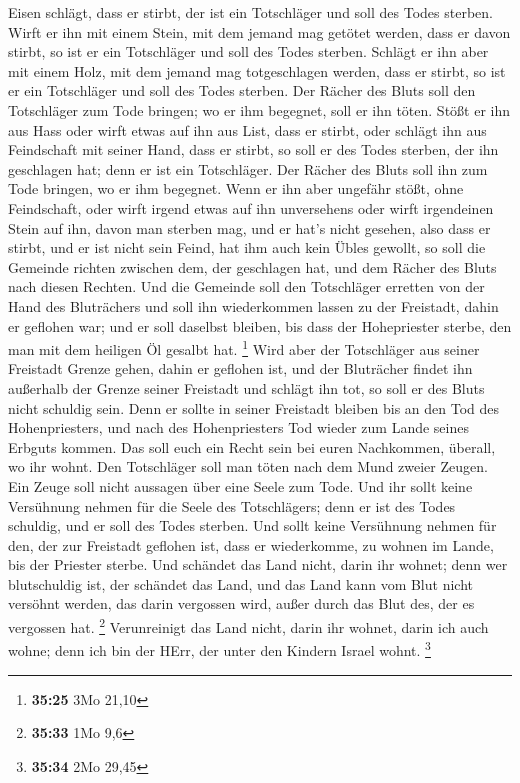 Eisen schlägt, dass er stirbt, der ist ein Totschläger und soll des
Todes sterben.  Wirft er ihn mit einem Stein, mit dem
jemand mag getötet werden, dass er davon stirbt, so ist er ein
Totschläger und soll des Todes sterben.  Schlägt er ihn
aber mit einem Holz, mit dem jemand mag totgeschlagen werden, dass er
stirbt, so ist er ein Totschläger und soll des Todes sterben.
 Der Rächer des Bluts soll den Totschläger zum Tode
bringen; wo er ihm begegnet, soll er ihn töten.  Stößt er
ihn aus Hass oder wirft etwas auf ihn aus List, dass er stirbt,
 oder schlägt ihn aus Feindschaft mit seiner Hand, dass er
stirbt, so soll er des Todes sterben, der ihn geschlagen hat; denn er
ist ein Totschläger. Der Rächer des Bluts soll ihn zum Tode bringen, wo
er ihm begegnet.  Wenn er ihn aber ungefähr stößt, ohne
Feindschaft, oder wirft irgend etwas auf ihn unversehens 
oder wirft irgendeinen Stein auf ihn, davon man sterben mag, und er
hat's nicht gesehen, also dass er stirbt, und er ist nicht sein Feind,
hat ihm auch kein Übles gewollt,  so soll die Gemeinde
richten zwischen dem, der geschlagen hat, und dem Rächer des Bluts nach
diesen Rechten.  Und die Gemeinde soll den Totschläger
erretten von der Hand des Bluträchers und soll ihn wiederkommen lassen
zu der Freistadt, dahin er geflohen war; und er soll daselbst bleiben,
bis dass der Hohepriester sterbe, den man mit dem heiligen Öl gesalbt
hat. \footnote{\textbf{35:25} 3Mo 21,10}  Wird aber der
Totschläger aus seiner Freistadt Grenze gehen, dahin er geflohen ist,
 und der Bluträcher findet ihn außerhalb der Grenze seiner
Freistadt und schlägt ihn tot, so soll er des Bluts nicht schuldig sein.
 Denn er sollte in seiner Freistadt bleiben bis an den Tod
des Hohenpriesters, und nach des Hohenpriesters Tod wieder zum Lande
seines Erbguts kommen.  Das soll euch ein Recht sein bei
euren Nachkommen, überall, wo ihr wohnt.  Den Totschläger
soll man töten nach dem Mund zweier Zeugen. Ein Zeuge soll nicht
aussagen über eine Seele zum Tode.  Und ihr sollt keine
Versühnung nehmen für die Seele des Totschlägers; denn er ist des Todes
schuldig, und er soll des Todes sterben.  Und sollt keine
Versühnung nehmen für den, der zur Freistadt geflohen ist, dass er
wiederkomme, zu wohnen im Lande, bis der Priester sterbe. 
Und schändet das Land nicht, darin ihr wohnet; denn wer blutschuldig
ist, der schändet das Land, und das Land kann vom Blut nicht versöhnt
werden, das darin vergossen wird, außer durch das Blut des, der es
vergossen hat. \footnote{\textbf{35:33} 1Mo 9,6} 
Verunreinigt das Land nicht, darin ihr wohnet, darin ich auch wohne;
denn ich bin der HErr, der unter den Kindern Israel wohnt. \footnote{\textbf{35:34}
  2Mo 29,45}

